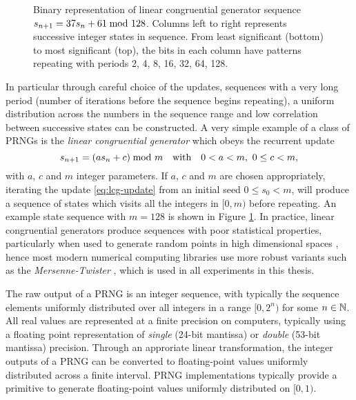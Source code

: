 \begin{figure}[!t]
\centering
{}
\drawgrid[zero color=black!80, one color=Maroon, cell ht=0.22em, cell wd=0.22em]{\lcgfile}
\caption[Example linear congruential generator sequence.]{Binary representation of linear congruential generator sequence $s_{n+1} = 37s_n + 61 \kern-4pt\mod 128$. Columns left to right represents successive integer states in sequence. From least significant (bottom) to most significant (top), the bits in each column have patterns repeating with periods 2, 4, 8, 16, 32, 64, 128.}
\label{fig:example-lcg-sequence}
\end{figure}

In particular through careful choice of the updates, sequences with a very long period (number of iterations before the sequence begins repeating), a uniform distribution across the numbers in the sequence range and low correlation between successive states can be constructed. A very simple example of a class of \acp{PRNG} is the \emph{linear congruential generator} \citep{lehmer1951mathematical} which obeys the recurrent update
\begin{equation}\label{eq:lcg-update}
  s_{n+1} = (a s_n + c) \kern-4pt\mod m
  \quad \textrm{with} \quad
   0 < a < m,~ 0 \leq c < m,
\end{equation}
with $a$, $c$ and $m$ integer parameters. If $a$, $c$ and $m$ are chosen appropriately, iterating the update \eqref{eq:lcg-update} from an initial seed $0 \leq s_0 < m$, will produce a sequence of states which visits all the integers in $[0, m)$ before repeating. An example state sequence with $m=128$ is shown in Figure \ref{fig:example-lcg-sequence}. In practice, linear congruential generators produce sequences with poor statistical properties, particularly when used to generate random points in high dimensional spaces \citep{marsaglia1968random}, hence most modern numerical computing libraries use more robust variants such as the \emph{Mersenne-Twister} \citep{matsumoto1998mersenne}, which is used in all experiments in this thesis.

The raw output of a \ac{PRNG} is an integer sequence, with typically the sequence elements uniformly distributed over all integers in a range $[0, 2^n)$ for some $n \in \mathbb{N}$. All real values are represented at a finite precision on computers, typically using a floating point representation \citep{ieee2008standard} of \emph{single} (24-bit mantissa) or \emph{double} (53-bit mantissa) precision. Through an approriate linear transformation, the integer outputs of a \ac{PRNG} can be converted to floating-point values uniformly distributed across a finite interval. \ac{PRNG} implementations typically provide a primitive to generate floating-point values uniformly distributed on $[0, 1)$.

